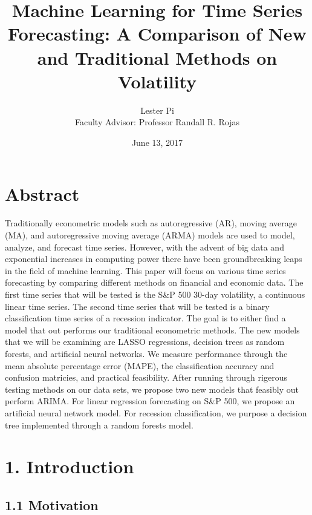 \documentclass[]{article}
\title{Machine Learning for Time Series Forecasting: A Comparison of New and
Traditional Methods on Volatility}
\author{Lester Pi \\ Faculty Advisor: Professor Randall R. Rojas}
\date{June 13, 2017}
\newenvironment{Shaded}{\begin{snugshade}}{\end{snugshade}}
\newcommand{\KeywordTok}[1]{\textcolor[rgb]{0.13,0.29,0.53}{\textbf{{#1}}}}
\newcommand{\DataTypeTok}[1]{\textcolor[rgb]{0.13,0.29,0.53}{{#1}}}
\newcommand{\OtherTok}[1]{\textcolor[rgb]{0.56,0.35,0.01}{{#1}}}
\newcommand{\NormalTok}[1]{{#1}}
\begin{document}
\maketitle

{
\setcounter{tocdepth}{2}
\tableofcontents
}
\begin{Shaded}
\end{Shaded}

\section{Abstract}\label{abstract}

Traditionally econometric models such as autoregressive (AR), moving
average (MA), and autoregressive moving average (ARMA) models are used
to model, analyze, and forecast time series. However, with the advent of
big data and exponential increases in computing power there have been
groundbreaking leaps in the field of machine learning. This paper will
focus on various time series forecasting by comparing different methods
on financial and economic data. The first time series that will be
tested is the S\&P 500 30-day volatility, a continuous linear time
series. The second time series that will be tested is a binary
classification time series of a recession indicator. The goal is to
either find a model that out performs our traditional econometric
methods. The new models that we will be examining are LASSO regressions,
decision trees as random forests, and artificial neural networks. We
measure performance through the mean absolute percentage error (MAPE),
the classification accuracy and confusion matricies, and practical
feasibility. After running through rigerous testing methods on our data
sets, we propose two new models that feasibly out perform ARIMA. For
linear regression forecasting on S\&P 500, we propose an artificial
neural network model. For recession classification, we purpose a
decision tree implemented through a random forests model.

\section{1. Introduction}\label{introduction}

\subsection{1.1 Motivation}\label{motivation}
\end{document}
